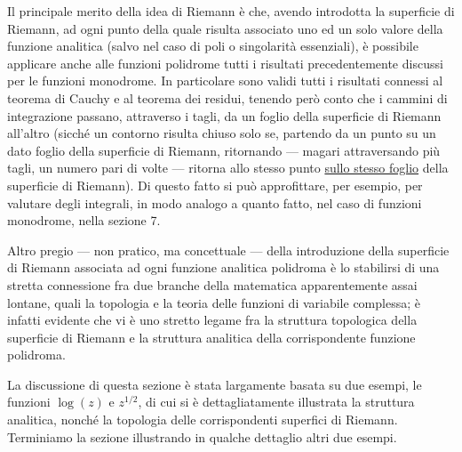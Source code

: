 \documentclass[11pt, a4paper]{book}
\numberwithin{equation}{section}
\begin{document}
Il principale merito della idea di Riemann è che, avendo introdotta la superficie di Riemann, ad ogni punto della quale risulta associato uno ed un solo valore della funzione analitica (salvo nel caso di poli o singolarità essenziali), è possibile applicare anche alle funzioni polidrome tutti i risultati precedentemente discussi per le funzioni monodrome. In particolare sono validi tutti i risultati connessi al teorema di Cauchy e al teorema dei residui, tenendo però conto che i cammini di integrazione passano, attraverso i tagli, da un foglio della superficie di Riemann all'altro (sicché un contorno risulta chiuso solo se, partendo da un punto su un dato foglio della superficie di Riemann, ritornando — magari attraversando più tagli, un numero pari di volte — ritorna allo stesso punto \uline{sullo stesso foglio} della superficie di Riemann). Di questo fatto si può approfittare, per esempio, per valutare degli integrali, in modo analogo a quanto fatto, nel caso di funzioni monodrome, nella sezione 7.

Altro pregio — non pratico, ma concettuale — della introduzione della superficie di Riemann associata ad ogni funzione analitica polidroma è lo stabilirsi di una stretta connessione fra due branche della matematica apparentemente assai lontane, quali la topologia e la teoria delle funzioni di variabile complessa; è infatti evidente che vi è uno stretto legame fra la%
struttura topologica della superficie di Riemann e la struttura analitica della corrispondente funzione polidroma.

La discussione di questa sezione è stata largamente basata su due esempi, le funzioni $\log(z)$ e $z^{1/2}$, di cui si è dettagliatamente illustrata la struttura analitica, nonché la topologia delle corrispondenti superfici di Riemann. Terminiamo la sezione illustrando in qualche dettaglio altri due esempi.
\end{document}
